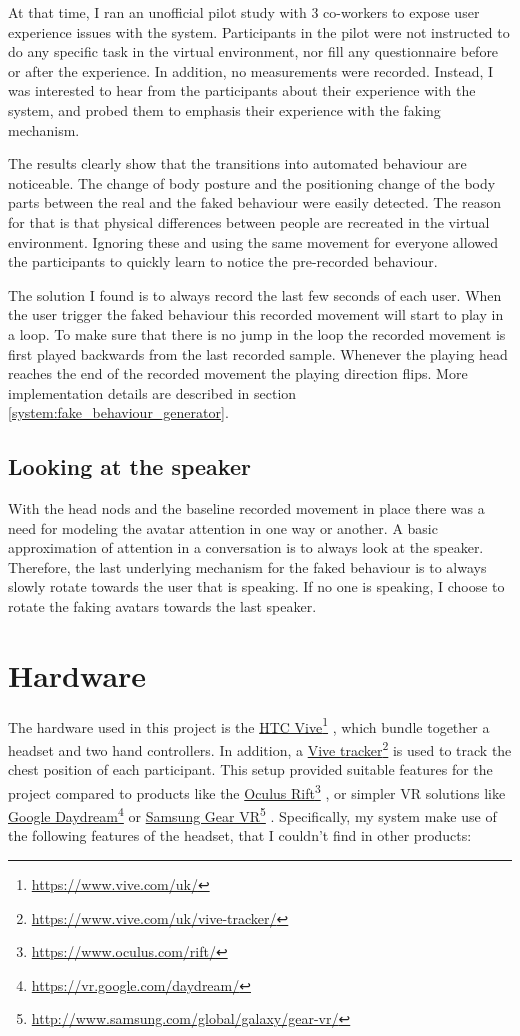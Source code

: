 \documentclass[]{simple-thesis}
\newcommand\fnurl[2]{%
  \href{#2}{#1}\footnote{\url{#2}}%
}
\begin{document}
At that time, I ran an unofficial pilot study with 3 co-workers to expose user experience issues with the system.
Participants in the pilot were not instructed to do any specific task in the virtual environment, nor fill any questionnaire before or after the experience.
In addition, no measurements were recorded.
Instead, I was interested to hear from the participants about their experience with the system, and probed them to emphasis their experience with the faking mechanism.

The results clearly show that the transitions into automated behaviour are noticeable.
The change of body posture and the positioning change of the body parts between the real and the faked behaviour were easily detected.
The reason for that is that physical differences between people are recreated in the virtual environment.
Ignoring these and using the same movement for everyone allowed the participants to quickly learn to notice the pre-recorded behaviour.

The solution I found is to always record the last few seconds of each user.
When the user trigger the faked behaviour this recorded movement will start to play in a loop.
To make sure that there is no jump in the loop the recorded movement is first played backwards from the last recorded sample.
Whenever the playing head reaches the end of the recorded movement the playing direction flips.
More implementation details are described in section \ref{system:fake_behaviour_generator}.

\subsection{Looking at the speaker}

With the head nods and the baseline recorded movement in place there was a need for modeling the avatar attention in one way or another.
A basic approximation of attention in a conversation is to always look at the speaker.
Therefore, the last underlying mechanism for the faked behaviour is to always slowly rotate towards the user that is speaking.
If no one is speaking, I choose to rotate the faking avatars towards the last speaker.

\section{Hardware}

The hardware used in this project is the \fnurl{HTC Vive}{https://www.vive.com/uk/}, which bundle together a headset and two hand controllers.
In addition, a \fnurl{Vive tracker}{https://www.vive.com/uk/vive-tracker/} is used to track the chest position of each participant.
This setup provided suitable features for the project compared to products like the \fnurl{Oculus Rift}{https://www.oculus.com/rift/}, or simpler VR solutions like \fnurl{Google Daydream}{https://vr.google.com/daydream/} or \fnurl{Samsung Gear VR}{http://www.samsung.com/global/galaxy/gear-vr/}.
Specifically, my system make use of the following features of the headset, that I couldn't find in other products:
\end{document}
